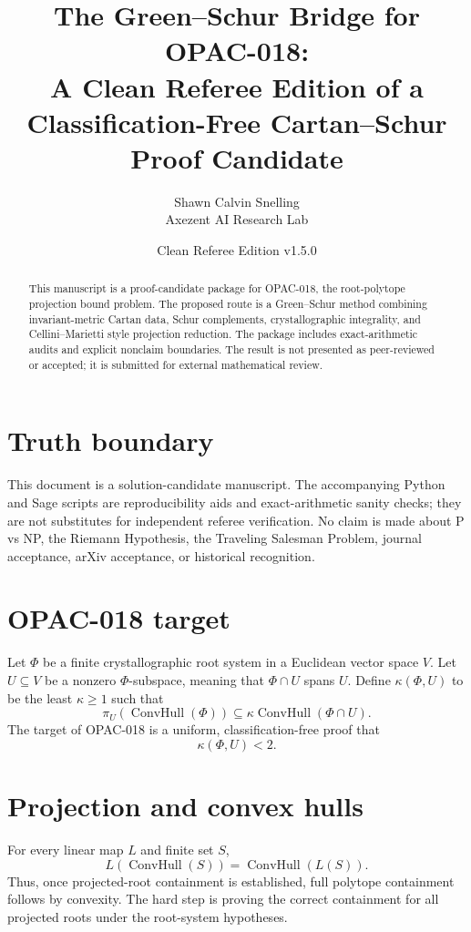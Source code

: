 \documentclass[11pt]{article}
\title{The Green--Schur Bridge for OPAC-018:\\A Clean Referee Edition of a Classification-Free Cartan--Schur Proof Candidate}
\author{Shawn Calvin Snelling\\Axezent AI Research Lab}
\date{Clean Referee Edition v1.5.0}
\begin{document}
\maketitle

\begin{abstract}
This manuscript is a proof-candidate package for OPAC-018, the root-polytope projection bound problem. The proposed route is a Green--Schur method combining invariant-metric Cartan data, Schur complements, crystallographic integrality, and Cellini--Marietti style projection reduction. The package includes exact-arithmetic audits and explicit nonclaim boundaries. The result is not presented as peer-reviewed or accepted; it is submitted for external mathematical review.
\end{abstract}

\section{Truth boundary}
This document is a solution-candidate manuscript. The accompanying Python and Sage scripts are reproducibility aids and exact-arithmetic sanity checks; they are not substitutes for independent referee verification. No claim is made about P vs NP, the Riemann Hypothesis, the Traveling Salesman Problem, journal acceptance, arXiv acceptance, or historical recognition.

\section{OPAC-018 target}
Let $\Phi$ be a finite crystallographic root system in a Euclidean vector space $V$. Let $U\subseteq V$ be a nonzero $\Phi$-subspace, meaning that $\Phi\cap U$ spans $U$. Define $\kappa(\Phi,U)$ to be the least $\kappa\geq 1$ such that
\[
\pi_U(\operatorname{ConvHull}(\Phi))\subseteq \kappa\operatorname{ConvHull}(\Phi\cap U).
\]
The target of OPAC-018 is a uniform, classification-free proof that
\[
\kappa(\Phi,U)<2.
\]

\section{Projection and convex hulls}
For every linear map $L$ and finite set $S$,
\[
L(\operatorname{ConvHull}(S))=\operatorname{ConvHull}(L(S)).
\]
Thus, once projected-root containment is established, full polytope containment follows by convexity. The hard step is proving the correct containment for all projected roots under the root-system hypotheses.
\end{document}
